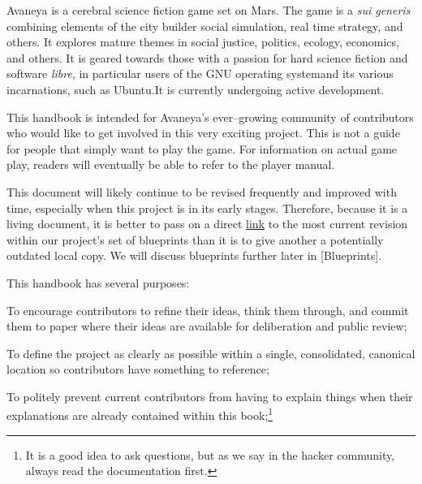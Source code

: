 

Avaneya is a cerebral science fiction game set on Mars. The game is a {\it sui generis} combining elements of the city builder social simulation, real time strategy, and others. It explores mature themes in social justice, politics, ecology, economics, and others. It is geared towards those with a passion for hard science fiction and software {\it libre}, in particular users of the GNU operating system and its various incarnations, such as Ubuntu. It is currently undergoing active development.

This handbook is intended for Avaneya's ever--growing community of contributors who would like to get involved in this very exciting project. This is not a guide for people that simply want to play the game. For information on actual game play, readers will eventually be able to refer to the player manual.

This document will likely continue to be revised frequently and improved with time, especially when this project is in its early stages. Therefore, because it is a living document, it is better to pass on a direct \href{\LatestHandbookURL}{link} to the most current revision within our project's set of blueprints than it is to give another a potentially outdated local copy. We will discuss blueprints further later in [Blueprints].

This handbook has several purposes:

\startitemize[4]
\item
To encourage contributors to refine their ideas, think them through, and commit them to paper where their ideas are available for deliberation and public review;

\item
To define the project as clearly as possible within a single, consolidated, canonical location so contributors have something to reference;

\item
To politely prevent current contributors from having to explain things when their explanations are already contained within this book;\footnote[rtfm]{It is a good idea to ask questions, but as we say in the hacker community, always read the documentation first.}

